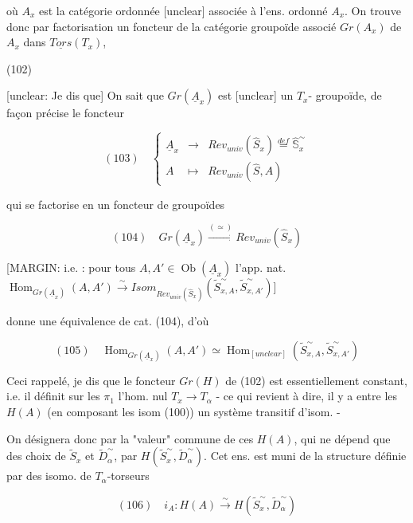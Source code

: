 où $A_x$ est la catégorie ordonnée [unclear] associée à l'ens. ordonné $A_x$. On trouve donc par factorisation un foncteur de la catégorie groupoïde associé $Gr(A_x)$ de $A_x$ dans $\underline{Tors}(T_x)$,

(102) 

\newpage


[unclear: Je dis que]
On sait que $Gr(\underline{A}_x)$ est [unclear] un $T_x$-
groupoïde, de façon précise le foncteur

$$ (103) \quad \left\{ \begin{array}{rcl} \underline{A}_x & \longrightarrow & Rev_{univ}(\hat{S}_x) \overset{def}{=} \hat{\mathbb{S}}_x^\sim \\ A & \longmapsto & Rev_{univ}(\hat{S}, A) \end{array} \right. $$

qui se factorise en un foncteur de
groupoïdes

$$ (104) \quad Gr(\underline{A}_x) \overset{(\simeq)}{\longrightarrow} Rev_{univ}(\hat{S}_x) $$

[MARGIN: i.e. : pour tous $A, A' \in \operatorname{Ob}(\underline{A}_x)$ l'app. nat. $\operatorname{Hom}_{Gr(\underline{A}_x)}(A, A') \overset{\sim}{\longrightarrow} Isom_{Rev_{univ}(\hat{S}_x)}(\tilde{S}_{x,A}^\sim, \tilde{S}_{x,A'}^\sim)$]

donne une équivalence de cat. (104), d'où

$$ (105) \quad \operatorname{Hom}_{Gr(\underline{A}_x)}(A, A') \simeq \operatorname{Hom}_{[unclear]}(\tilde{S}_{x,A}^\sim, \tilde{S}_{x,A'}^\sim) $$

Ceci rappelé, je dis que le foncteur
$Gr(H)$ de (102) est essentiellement constant,
i.e. il définit sur les $\pi_1$ l'hom. nul $T_x \to T_\alpha$
- ce qui revient à dire, il y a entre
les $H(A)$ (en composant les isom (100)) un système transitif d'isom. -

On désignera donc par la "valeur"
commune de ces $H(A)$, qui ne dépend
que des choix de $\tilde{S}_x$ et $\tilde{D}_\alpha^\sim$, par
$H(\tilde{S}_x^\sim, \tilde{D}_\alpha^\sim)$. Cet ens. est muni de la
structure définie par des isomo. de $T_\alpha$-torseurs

$$ (106) \quad i_A: H(A) \overset{\sim}{\longrightarrow} H(\tilde{S}_x^\sim, \tilde{D}_\alpha^\sim) $$

